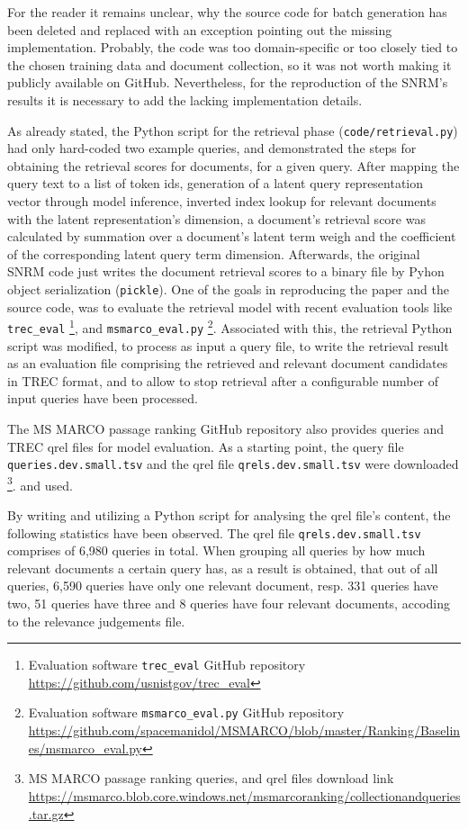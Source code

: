 For the reader it remains unclear, why the source code for batch generation has been deleted and replaced with an exception 
    pointing out the missing implementation. 
Probably, the code was too domain-specific or too closely tied to the chosen training data and document collection,
    so it was not worth making it publicly available on GitHub.
Nevertheless, for the reproduction of the SNRM's results it is necessary to add the lacking implementation details.

As already stated, the Python script for the retrieval phase (\texttt{code/retrieval.py}) had only hard-coded two example queries,
    and demonstrated the steps for obtaining the retrieval scores for documents, for a given query.
After mapping the query text to a list of token ids, generation of a latent query representation vector through model inference, 
    inverted index lookup for relevant documents with the latent representation's dimension, a document's retrieval score was
    calculated by summation over a document's latent term weigh and the coefficient of the corresponding latent query term dimension.
Afterwards, the original SNRM code just writes the document retrieval scores to a binary file by Pyhon object 
    serialization (\texttt{pickle}).
One of the goals in reproducing the paper and the source code, was to evaluate the retrieval model with recent evaluation tools like 
    \verb|trec_eval| \footnote{Evaluation software \texttt{trec\_eval} GitHub repository \url{https://github.com/usnistgov/trec_eval}},
    and \verb|msmarco_eval.py| 
    \footnote{Evaluation software \texttt{msmarco\_eval.py} GitHub repository \url{https://github.com/spacemanidol/MSMARCO/blob/master/Ranking/Baselines/msmarco_eval.py}}.
Associated with this, the retrieval Python script was modified, to process as input a query file, to write the retrieval result as an 
    evaluation file comprising the retrieved and relevant document candidates in TREC format, 
    and to allow to stop retrieval after a configurable number of input queries have been processed. 

The MS MARCO passage ranking GitHub repository also provides queries and TREC qrel files for model evaluation.
As a starting point, the query file \texttt{queries.dev.small.tsv} and the qrel file \texttt{qrels.dev.small.tsv} were downloaded
    \footnote{MS MARCO passage ranking queries, and qrel files download link \url{https://msmarco.blob.core.windows.net/msmarcoranking/collectionandqueries.tar.gz} }.
    and used.

By writing and utilizing a Python script for analysing the qrel file's content, the following statistics have been observed.
The qrel file \texttt{qrels.dev.small.tsv} comprises of 6,980 queries in total.
When grouping all queries by how much relevant documents a certain query has, as a result is obtained, that 
    out of all queries, 6,590 queries have only one relevant document, resp. 331 queries have two, 
    51 queries have three and 8 queries have four relevant documents, accoding to the relevance judgements file.

